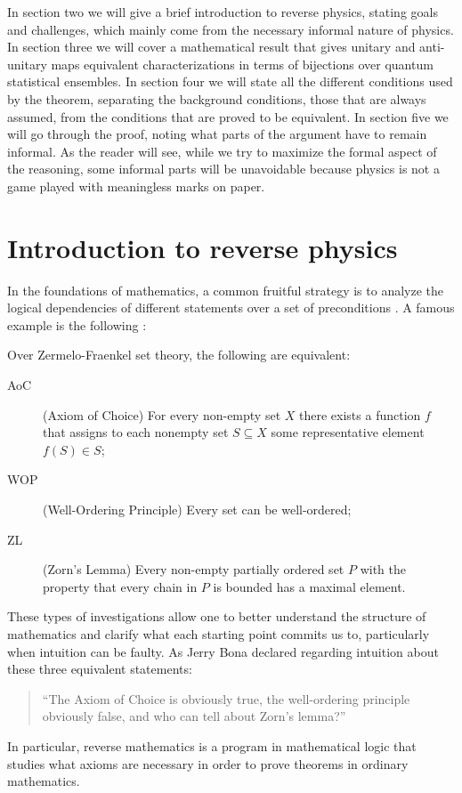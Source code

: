 \documentclass[entropy,article,submit,moreauthors]{Definitions/mdpi}
\begin{document}
In section two we will give a brief introduction to reverse physics, stating goals and challenges, which mainly come from the necessary informal nature of physics. In section three we will cover a mathematical result that gives unitary and anti-unitary maps equivalent characterizations in terms of bijections over quantum statistical ensembles. In section four we will state all the different conditions used by the theorem, separating the background conditions, those that are always assumed, from the conditions that are proved to be equivalent. In section five we will go through the proof, noting what parts of the argument have to remain informal. As the reader will see, while we try to maximize the formal aspect of the reasoning, some informal parts will be unavoidable because physics is not a game played with meaningless marks on paper.

\section{Introduction to reverse physics}

In the foundations of mathematics, a common fruitful strategy is to analyze the logical dependencies of different statements over a set of preconditions \cite{Simpson2009,Stillwell2018}. A famous example is the following \cite{Pinter2014,Schechter1997}:
\begin{Theorem}
	Over Zermelo-Fraenkel set theory, the following are equivalent:
	\begin{description}
		\item[AoC] (Axiom of Choice) For every non-empty set $X$ there exists a function $f$ that assigns to each nonempty set $S \subseteq X$ some
		representative element $f ( S ) \in S$;
		\item [WOP] (Well-Ordering Principle) Every set can be well-ordered;
		\item [ZL] (Zorn's Lemma) Every non-empty partially ordered set $P$ with the property that every chain in $P$ is bounded has a maximal element.
	\end{description}
\end{Theorem}
These types of investigations allow one to better understand the structure of mathematics and clarify what each starting point commits us to, particularly when intuition can be faulty. As Jerry Bona declared \cite[p. 145]{Schechter1997} regarding intuition about these three equivalent statements:
\begin{quote}
	``The Axiom of Choice is obviously true, the well-ordering principle obviously false, and who can tell about Zorn's lemma?''
\end{quote}
In particular, reverse mathematics is a program in mathematical logic that studies what axioms are necessary in order to prove theorems in ordinary mathematics.
\end{document}
